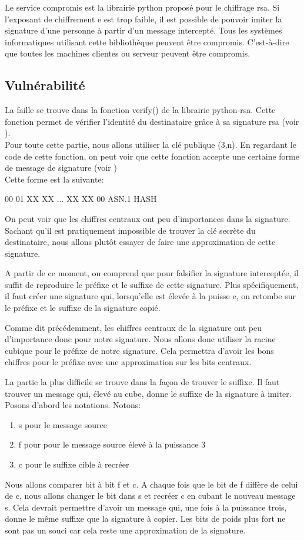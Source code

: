 \documentclass[a4,12pt]{article}
\begin{document}
Le service compromis est la librairie python proposé pour le chiffrage rsa. Si l'exposant de chiffrement e est trop faible, il est possible de pouvoir imiter la signature d'une personne à partir d'un message intercepté. Tous les systèmes informatiques utilisant cette bibliothèque peuvent être compromis. C'est-à-dire que toutes les machines clientes ou serveur peuvent être compromis.

\subsection{Vulnérabilité}
La faille se trouve dans la fonction verify() de la librairie python-rsa. Cette fonction permet de vérifier l'identité du destinataire grâce à sa signature rsa (voir ). \\
Pour toute cette partie, nous allons utiliser la clé publique (3,n).
En regardant le code de cette fonction, on peut voir que cette fonction accepte une certaine forme de message de signature (voir )\\
Cette forme est la suivante:
\begin{center}
00 01 XX XX ... XX XX 00 ASN.1 HASH 
\end{center}

On peut voir que les chiffres centraux ont peu d'importances dans la signature. Sachant qu'il est pratiquement impossible de trouver la clé secrète du destinataire, nous allons plutôt essayer de faire une approximation de cette signature.

A partir de ce moment, on comprend que pour falsifier la signature interceptée, il suffit de reproduire le préfixe et le suffixe de cette signature. Plus spécifiquement, il faut créer une signature qui, lorsqu'elle est élevée à la puisse e, on retombe sur le préfixe et le suffixe de la signature copié.

Comme dit précédemment, les chiffres centraux de la signature ont peu d'importance donc pour notre signature. Nous allons donc utiliser la racine cubique pour le préfixe de notre signature. Cela permettra d'avoir les bons chiffres pour le préfixe avec une approximation sur les bits centraux.

La partie la plus difficile se trouve dans la façon de trouver le suffixe. Il faut trouver un message qui, élevé au cube, donne le suffixe de la signature à imiter.
Posons d'abord les notations. Notons: 
\begin{enumerate}
\item s pour le message source
\item f pour pour le message source élevé à la puissance 3
\item c pour le suffixe cible à recréer
\end{enumerate}
Nous allons comparer bit à bit f et c. A chaque fois que le bit de f diffère de celui de c, nous allons changer le bit dans s et recréer c en cubant le nouveau message s. Cela devrait permettre d'avoir un message qui, une fois à la puissance trois, donne le même suffixe que la signature à copier. Les bits de poids plus fort ne sont pas un souci car cela reste une approximation de la signature.
\end{document}
